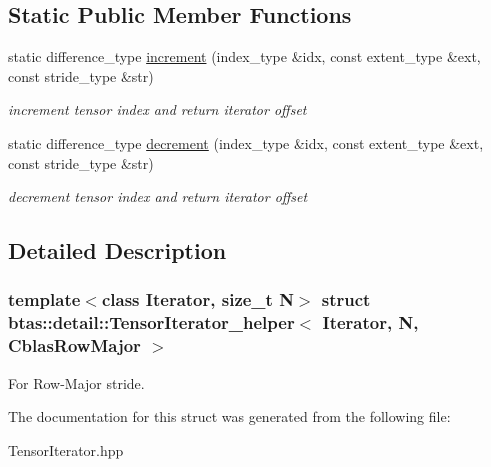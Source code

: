 \subsection*{Static Public Member Functions}
\begin{DoxyCompactItemize}
\item 
\hypertarget{structbtas_1_1detail_1_1_tensor_iterator__helper_3_01_iterator_00_01_n_00_01_cblas_row_major_01_4_a4292adcea6067709c986cc3baf28eb84}{
static difference\_\-type \hyperlink{structbtas_1_1detail_1_1_tensor_iterator__helper_3_01_iterator_00_01_n_00_01_cblas_row_major_01_4_a4292adcea6067709c986cc3baf28eb84}{increment} (index\_\-type \&idx, const extent\_\-type \&ext, const stride\_\-type \&str)}
\label{structbtas_1_1detail_1_1_tensor_iterator__helper_3_01_iterator_00_01_n_00_01_cblas_row_major_01_4_a4292adcea6067709c986cc3baf28eb84}

\begin{DoxyCompactList}\small\item\em increment tensor index and return iterator offset \item\end{DoxyCompactList}\item 
\hypertarget{structbtas_1_1detail_1_1_tensor_iterator__helper_3_01_iterator_00_01_n_00_01_cblas_row_major_01_4_a35b664ea08d182c6963057c82f70bfc1}{
static difference\_\-type \hyperlink{structbtas_1_1detail_1_1_tensor_iterator__helper_3_01_iterator_00_01_n_00_01_cblas_row_major_01_4_a35b664ea08d182c6963057c82f70bfc1}{decrement} (index\_\-type \&idx, const extent\_\-type \&ext, const stride\_\-type \&str)}
\label{structbtas_1_1detail_1_1_tensor_iterator__helper_3_01_iterator_00_01_n_00_01_cblas_row_major_01_4_a35b664ea08d182c6963057c82f70bfc1}

\begin{DoxyCompactList}\small\item\em decrement tensor index and return iterator offset \item\end{DoxyCompactList}\end{DoxyCompactItemize}


\subsection{Detailed Description}
\subsubsection*{template$<$class Iterator, size\_\-t N$>$ struct btas::detail::TensorIterator\_\-helper$<$ Iterator, N, CblasRowMajor $>$}

For Row-\/Major stride. 

The documentation for this struct was generated from the following file:\begin{DoxyCompactItemize}
\item 
TensorIterator.hpp\end{DoxyCompactItemize}
